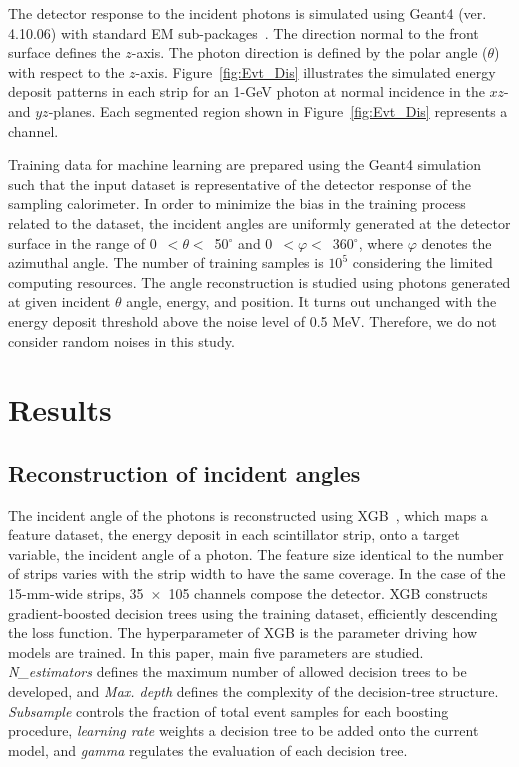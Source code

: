\documentclass[12pt,times,draftclsnofoot,a4paper]{elsarticle}
\begin{document}
The detector response to the incident photons is simulated using Geant4 (ver. 4.10.06) with standard EM sub-packages~\cite{GEANT4}. The direction normal to the front surface defines the $z$-axis. The photon direction is defined by the polar angle ($\theta$) with respect to the $z$-axis. Figure~\ref{fig:Evt_Dis} illustrates the simulated energy deposit patterns in each strip for an 1-GeV photon at normal incidence in the $xz$- and $yz$-planes. Each segmented region shown in Figure~\ref{fig:Evt_Dis} represents a channel. 

Training data for machine learning are prepared using the Geant4 simulation such that the input dataset is representative of the detector response of the sampling calorimeter. In order to minimize the bias in the training process related to the dataset, the incident angles are uniformly generated at the detector surface in the range of 0~$<\theta<$~50$^{\circ}$ and 0~$<\varphi<$~360$^{\circ}$, where $\varphi$ denotes the azimuthal angle. The number of training samples is $10^{5}$ considering the limited computing resources. The angle reconstruction is studied using photons generated at given incident $\theta$ angle, energy, and position. It turns out unchanged with the energy deposit threshold above the noise level of 0.5 MeV. Therefore, we do not consider random noises in this study. 

\section{Results}
\label{sec:res}
\subsection{Reconstruction of incident angles}
\label{sec:reco}

The incident angle of the photons is reconstructed using XGB~\cite{xgboost:2016}, which maps a feature dataset, the energy deposit in each scintillator strip, onto a target variable, the incident angle of a photon. The feature size identical to the number of strips varies with the strip width to have the same coverage. In the case of the 15-mm-wide strips, 35~$\times$~105 channels compose the detector. XGB constructs gradient-boosted decision trees using the training dataset, efficiently descending the loss function. The hyperparameter of XGB is the parameter driving how models are trained. In this paper, main five parameters are studied. \textit{N\_estimators} defines the maximum number of allowed decision trees to be developed, and \textit{Max. depth} defines the complexity of the decision-tree structure. \textit{Subsample} controls the fraction of total event samples for each boosting procedure, \textit{learning rate} weights a decision tree to be added onto the current model, and \textit{gamma} regulates the evaluation of each decision tree.
\end{document}
